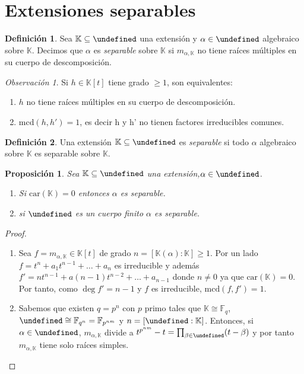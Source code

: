\documentclass[10pt, spanish]{report}
\newtheorem{prop}[tma]{Proposición}
\theoremstyle{definition}
\newtheorem*{defin}{Definición}
\theoremstyle{custom}
\theoremstyle{remark}
\newtheorem*{obs}{Observación}
\newcommand{\F}{\mathbb{F}}
\newcommand{\K}{\mathbb{K}}
\let\L\undefined
\newcommand{\L}{\mathbb{L}}
\newcommand{\car}[1]{\text{car}(#1)}
\newcommand{\mcd}[1]{\text{mcd}(#1)}
\renewcommand{\geq}{\geqslant}
\newcommand{\fecha}[1]{\marginpar{\underline{\footnotesize{#1}}}}
\begin{document}
\fecha{24/03} %

\section{Extensiones separables}

\begin{defin}
    Sea $\K\subseteq\L$ una extensión y $\alpha\in\L$ algebraico sobre $\K$.
    Decimos que $\alpha$ es \textit{separable} sobre $\K$ si $m_{\alpha,\K}$ no
    tiene raíces múltiples en su cuerpo de descomposición.
\end{defin}

\begin{obs}
    Si $h\in\K[t]$ tiene grado $\geq1$, son equivalentes:
    \begin{enumerate}
        \item $h$ no tiene raíces múltiples en su cuerpo de descomposición.
        \item $\mcd{h,h'}=1$, es decir h y h' no tienen factores irreducibles
            comunes.
    \end{enumerate}
\end{obs}

\begin{defin}
    Una extensión $\K\subseteq\L$ es \textit{separable} si todo $\alpha$
    algebraico sobre $\K$ es separable sobre $\K$.
\end{defin}

\begin{prop}
    Sea $\K\subseteq\L$ una extensión,$\alpha\in\L$.
    \begin{enumerate}
        \item Si $\car\K=0$ entonces $\alpha$ es separable.
        \item si $\L$ es un cuerpo finito $\alpha$ es separable.
    \end{enumerate}
\end{prop}

\begin{proof}\hspace{0pt}
    \begin{enumerate}
        \item Sea $f=m_{\alpha,\K}\in\K[t]$ de grado $n=[\K(\alpha):\K]\geq1$.
            Por un lado $f=t^n+a_1t^{n-1}+\ldots+a_n$ es irreducible y además
            $f'=nt^{n-1}+a(n-1)t^{n-2}+\ldots+a_{n-1}$ donde $n\neq0$ ya que
            $\car\K=0$. Por tanto, como $\deg{f'}=n-1$ y $f$ es irreducible,
            $\mcd{f,f'}=1$.
        \item Sabemos que existen $q=p^n$ con $p$ primo tales que $\K\cong\F_q$,
            $\L\cong\F_{q^n}=\F_{p^{nm}}$ y $n=[\L:\K]$. Entonces, si
            $\alpha\in\L$, $m_{\alpha,\K}$ divide a $t^{p^{nm}}-t=\prod_{\beta
            \in\L}(t-\beta)$ y por tanto $m_{\alpha,\K}$ tiene solo raíces
            simples.
    \end{enumerate}
\end{proof}
\end{document}
